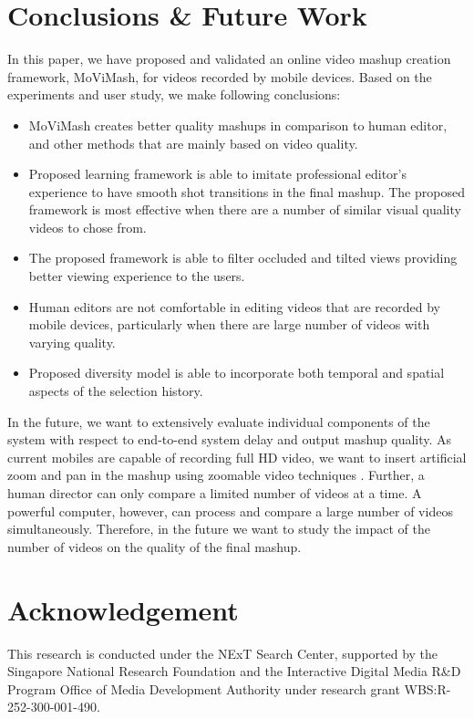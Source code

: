 \documentclass{sig-alternate}
\begin{document}
\section{ Conclusions \& Future Work}\label{future}
In this paper, we have proposed and validated an online video
mashup creation framework, MoViMash, for videos recorded by mobile devices. Based on the experiments and user study, we make following conclusions:
\begin{itemize}
    \item MoViMash creates better quality mashups in comparison to human editor, and other methods that are mainly based on video quality.
    \item Proposed learning framework is able to imitate professional editor\textquoteright s experience to have smooth shot transitions in the final mashup. The proposed framework is most effective when there are a number of similar visual quality videos to chose from.
    \item The proposed framework is able to filter occluded and tilted views providing better viewing experience to the users.
    \item Human editors are not comfortable in editing videos that are recorded by mobile devices, particularly when there are large number of videos with varying quality.
    \item Proposed diversity model is able to incorporate both temporal and spatial aspects of the selection history.
\end{itemize}
In the future, we want to extensively evaluate individual components of the system with respect to end-to-end system delay and output mashup quality. As current mobiles are capable of recording full HD video, we want to insert artificial zoom and pan in the mashup using zoomable video techniques \cite{11}. Further, a human director can only compare a limited number of videos at a time. A powerful computer, however, can process and compare a large number of videos simultaneously. Therefore, in the future we want to study the impact of the number of videos on the quality of the final mashup.

\section*{Acknowledgement}
This research is conducted under the NExT Search Center, supported
by the Singapore National Research Foundation and the Interactive
Digital Media R\&D Program Office of Media Development Authority under research grant WBS:R-252-300-001-490.
\end{document}
